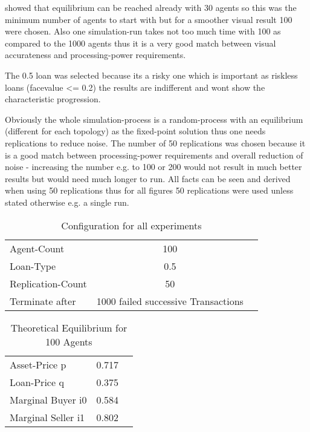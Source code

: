 \documentclass[Bachelorarbeit.tex]{subfiles}
\begin{document}
\bigskip 

\cite{Breuer2015} showed that equilibrium can be reached already with 30 agents so this was the minimum number of agents to start with but for a smoother visual result 100 were chosen. Also one simulation-run takes not too much time with 100 as compared to the 1000 agents thus it is a very good match between visual accurateness and processing-power requirements.

\medskip

The 0.5 loan was selected because its a risky one which is important as riskless loans (facevalue <= 0.2) the results are indifferent and wont show the characteristic progression.

\medskip

Obviously the whole simulation-process is a random-process with an equilibrium (different for each topology) as the fixed-point solution thus one needs replications to reduce noise. The number of 50 replications was chosen because it is a good match between processing-power requirements and overall reduction of noise - increasing the number e.g. to 100 or 200 would not result in much better results but would need much longer to run. All facts can be seen and derived when using 50 replications thus for all figures 50 replications were used unless stated otherwise e.g. a single run.

\begin{table}[H]
	\centering
	\caption{Configuration for all experiments}
	\begin{tabular} { l c r }
		\hline
		Agent-Count & 100 \\
		Loan-Type & 0.5 \\
		Replication-Count & 50 \\
		Terminate after & 1000 failed successive Transactions \\
		\hline
	\end{tabular}
\end{table}

\begin{table}[H]
	\centering
	\caption{Theoretical Equilibrium for 100 Agents}
	\begin{tabular} { l c r }
		\hline
		Asset-Price p & 0.717 \\
		Loan-Price q & 0.375 \\
		Marginal Buyer i0 & 0.584 \\
		Marginal Seller i1 & 0.802 \\
		\hline
	\end{tabular}
	\label{tab:theoretical_equilibrium_100Agents_05Bond}
\end{table}
\end{document}
